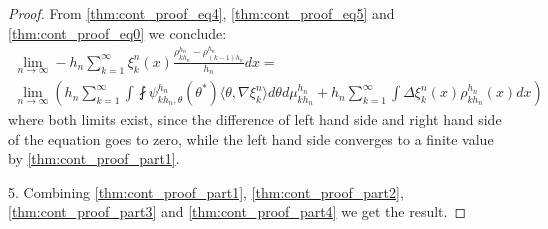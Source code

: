 \begin{proof}
From \ref{thm:cont_proof_eq4}, \ref{thm:cont_proof_eq5} and \ref{thm:cont_proof_eq0} we conclude:
\begin{multline} \label{thm:cont_proof_part4}
\lim_{n \rightarrow \infty} - h_n \sum_{k=1}^{\infty} \xi_k^n(x)\frac{\rho_{kh_n}^{h_n} - \rho_{(k-1)h_n}^{h_n}}{h_n} dx = \\
\lim_{n \rightarrow \infty} \left( h_n \sum_{k=1}^{\infty} \int \fint \psi_{kh_n, \theta}^{h_n} (\theta^{*}) \langle \theta, \nabla \xi_{k}^n \rangle d \theta d\mu_{kh_n}^{h_n} + h_n \sum_{k=1}^{\infty} \int \Delta \xi_k^n(x) \rho_{kh_n}^{h_n}(x) dx  \right)
\end{multline}
where both limits exist, since the difference of left hand side and right hand side of the equation goes to zero, while the left hand side converges to a finite value by \ref{thm:cont_proof_part1}.

5. Combining \ref{thm:cont_proof_part1}, \ref{thm:cont_proof_part2}, \ref{thm:cont_proof_part3} and \ref{thm:cont_proof_part4} we get the result.
\end{proof}